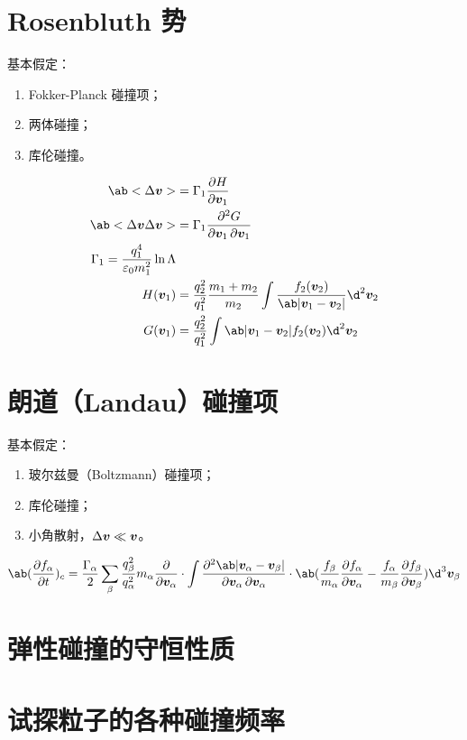 \section{Rosenbluth 势}

基本假定：
\begin{enumerate}
    \item Fokker-Planck 碰撞项；
    \item 两体碰撞；
    \item 库伦碰撞。
\end{enumerate}

\begin{subequations}\begin{align}
\ab<\Delta\vector{v}> &= \Gamma_1 \pdv{H}{\vector{v}_1} \\
\ab<\Delta\vector{v}\Delta\vector{v}> &=
    \Gamma_1 \pdv{G}{\vector{v}_1,\vector{v}_1} \\
\Gamma_1 = \frac{q_1^4}{\varepsilon_0 m_1^2} \ln\Lambda \\
H(\vector{v}_1) &= \frac{q_2^2}{q_1^2} \frac{m_1 + m_2}{m_2}
\int \frac{f_2(\vector{v}_2)}{\ab|\vector{v}_1 - \vector{v}_2|} \d^2\vector{v}_2 \\
G(\vector{v}_1) &= \frac{q_2^2}{q_1^2}
\int \ab|\vector{v}_1 - \vector{v}_2| f_2(\vector{v}_2) \d^2\vector{v}_2 \\
\end{align}\end{subequations}

\section{朗道（Landau）碰撞项}

基本假定：
\begin{enumerate}
    \item 玻尔兹曼（Boltzmann）碰撞项；
    \item 库伦碰撞；
    \item 小角散射，$\Delta\bm{v}\ll\bm{v}$。
\end{enumerate}

\begin{equation}
\ab(\pdv{f_\alpha}{t})_c =
\frac{\Gamma_\alpha}{2} \sum_\beta \frac{q_\beta^2}{q_\alpha^2} m_\alpha
\pdv{}{\vector{v}_\alpha} \cdot
\int \pdv{\ab|\vector{v}_\alpha-\vector{v}_\beta|}{\vector{v}_\alpha,\vector{v}_\alpha}
\cdot \ab(
    \frac{f_\beta}{m_\alpha} \pdv{f_\alpha}{\vector{v}_\alpha}
    - \frac{f_\alpha}{m_\beta} \pdv{f_\beta}{\vector{v}_\beta}
) \d^3\vector{v}_\beta
\end{equation}

\section{弹性碰撞的守恒性质}

\section{试探粒子的各种碰撞频率}
